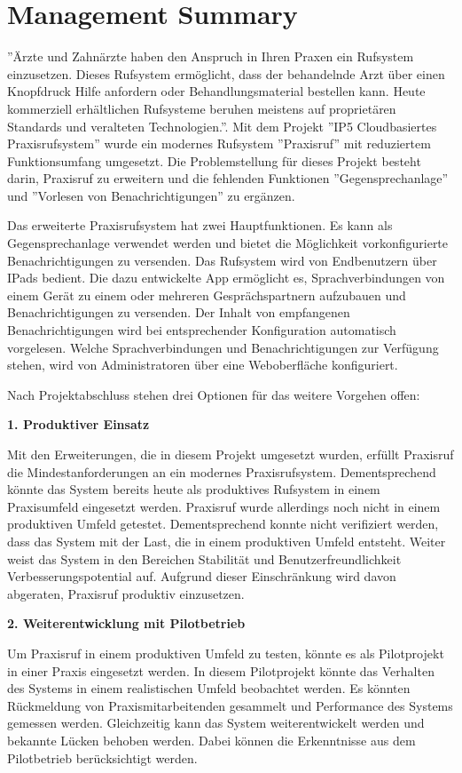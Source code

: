 \section*{Management Summary}

''Ärzte und Zahnärzte haben den Anspruch in Ihren Praxen ein Rufsystem einzusetzen.
Dieses Rufsystem ermöglicht, dass der behandelnde Arzt über einen Knopfdruck Hilfe anfordern oder Behandlungsmaterial bestellen kann.
Heute kommerziell erhältlichen Rufsysteme beruhen meistens auf proprietären Standards und veralteten Technologien.''\cite{aufgabenstellung}.
Mit dem Projekt ''IP5 Cloudbasiertes Praxisrufsystem'' wurde ein modernes Rufsystem ''Praxisruf'' mit reduziertem Funktionsumfang umgesetzt.
Die Problemstellung für dieses Projekt besteht darin, Praxisruf zu erweitern und die fehlenden Funktionen ''Gegensprechanlage'' und ''Vorlesen von Benachrichtigungen'' zu ergänzen.

Das erweiterte Praxisrufsystem hat zwei Hauptfunktionen.
Es kann als Gegensprechanlage verwendet werden und bietet die Möglichkeit vorkonfigurierte Benachrichtigungen zu versenden.
Das Rufsystem wird von Endbenutzern über IPads bedient.
Die dazu entwickelte App ermöglicht es, Sprachverbindungen von einem Gerät zu einem oder mehreren Gesprächspartnern aufzubauen und Benachrichtigungen zu versenden.
Der Inhalt von empfangenen Benachrichtigungen wird bei entsprechender Konfiguration automatisch vorgelesen.
Welche Sprachverbindungen und Benachrichtigungen zur Verfügung stehen, wird von Administratoren über eine Weboberfläche konfiguriert.

Nach Projektabschluss stehen drei Optionen für das weitere Vorgehen offen:

\textbf{1. Produktiver Einsatz}

Mit den Erweiterungen, die in diesem Projekt umgesetzt wurden, erfüllt Praxisruf die Mindestanforderungen an ein modernes Praxisrufsystem.
Dementsprechend könnte das System bereits heute als produktives Rufsystem in einem Praxisumfeld eingesetzt werden.
Praxisruf wurde allerdings noch nicht in einem produktiven Umfeld getestet.
Dementsprechend konnte nicht verifiziert werden, dass das System mit der Last, die in einem produktiven Umfeld entsteht.
Weiter weist das System in den Bereichen Stabilität und Benutzerfreundlichkeit Verbesserungspotential auf.
Aufgrund dieser Einschränkung wird davon abgeraten, Praxisruf produktiv einzusetzen.

\textbf{2. Weiterentwicklung mit Pilotbetrieb}

Um Praxisruf in einem produktiven Umfeld zu testen, könnte es als Pilotprojekt in einer Praxis eingesetzt werden.
In diesem Pilotprojekt könnte das Verhalten des Systems in einem realistischen Umfeld beobachtet werden.
Es könnten Rückmeldung von Praxismitarbeitenden gesammelt und Performance des Systems gemessen werden.
Gleichzeitig kann das System weiterentwickelt werden und bekannte Lücken behoben werden.
Dabei können die Erkenntnisse aus dem Pilotbetrieb berücksichtigt werden.

